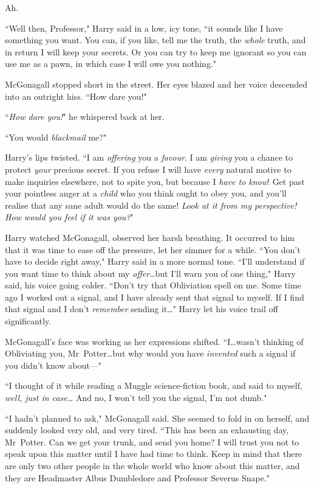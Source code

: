 Ah.

``Well then, Professor," Harry said in a low, icy tone, ``it sounds like I have something you want. You can, if you like, tell me the truth, the \emph{whole} truth, and in return I will keep your secrets. Or you can try to keep me ignorant so you can use me as a pawn, in which case I will owe you nothing."

McGonagall stopped short in the street. Her eyes blazed and her voice descended into an outright hiss. ``How dare you!"

``\emph{How dare you!}" he whispered back at her.

``You would \emph{blackmail} me?"

Harry's lips twisted. ``I am \emph{offering} you a \emph{favour}. I am \emph{giving} you a chance to protect \emph{your} precious secret. If you refuse I will have \emph{every} natural motive to make inquiries elsewhere, not to spite you, but because I \emph{have to know}! Get past your pointless anger at a \emph{child} who you think ought to obey you, and you'll realise that any sane adult would do the same! \emph{Look at it from my perspective! How would you feel if it was \emph{you}?}"

Harry watched McGonagall, observed her harsh breathing. It occurred to him that it was time to ease off the pressure, let her simmer for a while. ``You don't have to decide right away," Harry said in a more normal tone. ``I'll understand if you want time to think about my \emph{offer}…but I'll warn you of one thing," Harry said, his voice going colder. ``Don't try that Obliviation spell on me. Some time ago I worked out a signal, and I have already sent that signal to myself. If I find that signal and I don't \emph{remember} sending it…" Harry let his voice trail off significantly.

McGonagall's face was working as her expressions shifted. ``I…wasn't thinking of Obliviating you, Mr~Potter…but why would you have \emph{invented} such a signal if you didn't know about—"

``I thought of it while reading a Muggle science-fiction book, and said to myself, \emph{well, just in case…} And no, I won't tell you the signal, I'm not dumb."

``I hadn't planned to ask," McGonagall said. She seemed to fold in on herself, and suddenly looked very old, and very tired. ``This has been an exhausting day, Mr~Potter. Can we get your trunk, and send you home? I will trust you not to speak upon this matter until I have had time to think. Keep in mind that there are only two other people in the whole world who know about this matter, and they are Headmaster Albus Dumbledore and Professor Severus Snape."


